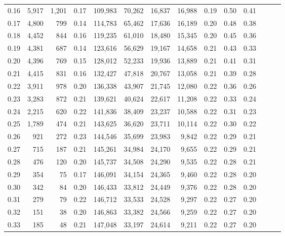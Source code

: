\begin{tabular}{rrrrrrrrrrrrrr}
0.16 &   5,917 &  1,201 &  0.17 &  109,983 &   70,262 &  16,837 &  16,988 &  0.19 &  0.50 &      0.41 \\
0.17 &   4,800 &    799 &  0.14 &  114,783 &   65,462 &  17,636 &  16,189 &  0.20 &  0.48 &      0.38 \\
0.18 &   4,452 &    844 &  0.16 &  119,235 &   61,010 &  18,480 &  15,345 &  0.20 &  0.45 &      0.36 \\
0.19 &   4,381 &    687 &  0.14 &  123,616 &   56,629 &  19,167 &  14,658 &  0.21 &  0.43 &      0.33 \\
0.20 &   4,396 &    769 &  0.15 &  128,012 &   52,233 &  19,936 &  13,889 &  0.21 &  0.41 &      0.31 \\
0.21 &   4,415 &    831 &  0.16 &  132,427 &   47,818 &  20,767 &  13,058 &  0.21 &  0.39 &      0.28 \\
0.22 &   3,911 &    978 &  0.20 &  136,338 &   43,907 &  21,745 &  12,080 &  0.22 &  0.36 &      0.26 \\
0.23 &   3,283 &    872 &  0.21 &  139,621 &   40,624 &  22,617 &  11,208 &  0.22 &  0.33 &      0.24 \\
0.24 &   2,215 &    620 &  0.22 &  141,836 &   38,409 &  23,237 &  10,588 &  0.22 &  0.31 &      0.23 \\
0.25 &   1,789 &    474 &  0.21 &  143,625 &   36,620 &  23,711 &  10,114 &  0.22 &  0.30 &      0.22 \\
0.26 &     921 &    272 &  0.23 &  144,546 &   35,699 &  23,983 &   9,842 &  0.22 &  0.29 &      0.21 \\
0.27 &     715 &    187 &  0.21 &  145,261 &   34,984 &  24,170 &   9,655 &  0.22 &  0.29 &      0.21 \\
0.28 &     476 &    120 &  0.20 &  145,737 &   34,508 &  24,290 &   9,535 &  0.22 &  0.28 &      0.21 \\
0.29 &     354 &     75 &  0.17 &  146,091 &   34,154 &  24,365 &   9,460 &  0.22 &  0.28 &      0.20 \\
0.30 &     342 &     84 &  0.20 &  146,433 &   33,812 &  24,449 &   9,376 &  0.22 &  0.28 &      0.20 \\
0.31 &     279 &     79 &  0.22 &  146,712 &   33,533 &  24,528 &   9,297 &  0.22 &  0.27 &      0.20 \\
0.32 &     151 &     38 &  0.20 &  146,863 &   33,382 &  24,566 &   9,259 &  0.22 &  0.27 &      0.20 \\
0.33 &     185 &     48 &  0.21 &  147,048 &   33,197 &  24,614 &   9,211 &  0.22 &  0.27 &      0.20 \\

\end{tabular}
